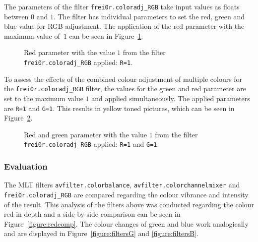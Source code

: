 \documentclass[../MasterThesis.tex]{subfiles}
\begin{document}
The parameters of the filter \texttt{frei0r.coloradj\_RGB} take input values as floats between $0$ and $1$. The filter has individual parameters to set the red, green and blue value for RGB adjustment. The application of the red parameter with the maximum value of~$1$ can be seen in Figure~\ref{figure:r}.


\begin{figure}[H]
	\begin{center}
		\caption[Red parameter set to $1$ with \texttt{frei0r.coloradj\_RGB}.]{Red parameter with the value $1$ from the filter \texttt{frei0r.coloradj\_RGB} applied: \texttt{R=1}.}
		\label{figure:r}
	\end{center}
\end{figure}

To assess the effects of the combined colour adjustment of multiple colours for the \texttt{frei0r.coloradj\_RGB} filter, the values for the green and red parameter are set to the maximum value $1$ and applied simultaneously. The applied parameters are \texttt{R=1} and \texttt{G=1}. This results in yellow toned pictures, which can be seen in Figure~\ref{figure:rg}.


\begin{figure}[H]
	\begin{center}
		\caption[Red and green parameter set to $1$ with \texttt{frei0r.coloradj\_RGB}.]{Red and green parameter with the value $1$ from the filter \texttt{frei0r.coloradj\_RGB} applied: \texttt{R=1} and \texttt{G=1}.}
		\label{figure:rg}
	\end{center}
\end{figure}




\subsubsection*{Evaluation}




The MLT filters \texttt{avfilter.colorbalance}, \texttt{avfilter\-.colorchannelmixer} and \texttt{frei\-0r\-.coloradj\_RGB} are compared regarding the colour vibrance and intensity of the result. This analysis of the filters above was conducted regarding the colour red in depth and a side-by-side comparison can be seen in Figure~\ref{figure:redcomp}. The colour changes of green and blue work analogically and are displayed in Figure~\ref{figure:filtersG} and \ref{figure:filtersB}.
%
\end{document}
